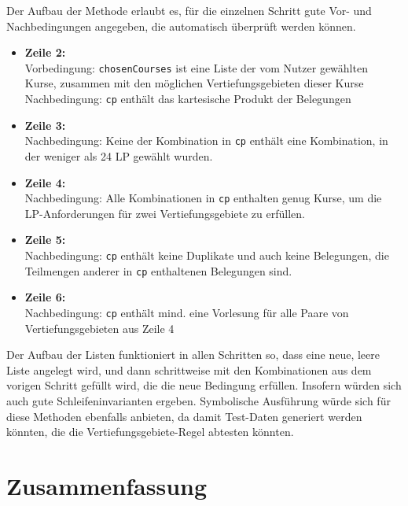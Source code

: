 \documentclass[ngerman]{article}
\begin{document}
Der Aufbau der Methode erlaubt es, für die einzelnen Schritt gute Vor- und Nachbedingungen angegeben, die automatisch überprüft werden können.
\begin{itemize}
    \item
        \textbf{Zeile 2:} \\
        Vorbedingung: \texttt{chosenCourses} ist eine Liste der vom Nutzer gewählten Kurse, zusammen mit den möglichen Vertiefungsgebieten dieser Kurse
        Nachbedingung: \texttt{cp} enthält das kartesische Produkt der Belegungen
    \item
        \textbf{Zeile 3:} \\
        Nachbedingung: Keine der Kombination in \texttt{cp} enthält eine Kombination, in der weniger als 24 LP gewählt wurden.
    \item
        \textbf{Zeile 4:} \\
        Nachbedingung: Alle Kombinationen in \texttt{cp} enthalten genug Kurse, um die LP-Anforderungen für zwei Vertiefungsgebiete zu erfüllen.
    \item
        \textbf{Zeile 5:} \\
        Nachbedingung: \texttt{cp} enthält keine Duplikate und auch keine Belegungen, die Teilmengen anderer in \texttt{cp} enthaltenen Belegungen sind.
    \item
        \textbf{Zeile 6:} \\
        Nachbedingung: \texttt{cp} enthält mind. eine Vorlesung für alle Paare von Vertiefungsgebieten aus Zeile 4
\end{itemize}
Der Aufbau der Listen funktioniert in allen Schritten so, dass eine neue, leere Liste angelegt wird, und dann schrittweise mit den Kombinationen aus dem vorigen Schritt gefüllt wird, die die neue Bedingung erfüllen.
Insofern würden sich auch gute Schleifeninvarianten ergeben.
Symbolische Ausführung würde sich für diese Methoden ebenfalls anbieten, da damit Test-Daten generiert werden könnten, die die Vertiefungsgebiete-Regel abtesten könnten.


\section{Zusammenfassung}
\end{document}
